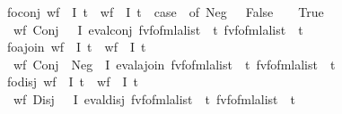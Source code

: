 \begin{isabellebody}
\ \ \ fo{\isacharunderscore}{\kern0pt}conj{\isacharcolon}{\kern0pt}\ {\isachardoublequoteopen}wf\ {\isasymphi}\ I\ t{\isasymphi}\ {\isasymLongrightarrow}\ wf\ {\isasympsi}\ I\ t{\isasympsi}\ {\isasymLongrightarrow}\ {\isacharparenleft}{\kern0pt}case\ {\isasympsi}\ of\ Neg\ {\isasympsi}{\isacharprime}{\kern0pt}\ {\isasymRightarrow}\ False\ {\isacharbar}{\kern0pt}\ {\isacharunderscore}{\kern0pt}\ {\isasymRightarrow}\ True{\isacharparenright}{\kern0pt}\ {\isasymLongrightarrow}\isanewline
\ \ \ \ wf\ {\isacharparenleft}{\kern0pt}Conj\ {\isasymphi}\ {\isasympsi}{\isacharparenright}{\kern0pt}\ I\ {\isacharparenleft}{\kern0pt}eval{\isacharunderscore}{\kern0pt}conj\ {\isacharparenleft}{\kern0pt}fv{\isacharunderscore}{\kern0pt}fo{\isacharunderscore}{\kern0pt}fmla{\isacharunderscore}{\kern0pt}list\ {\isasymphi}{\isacharparenright}{\kern0pt}\ t{\isasymphi}\ {\isacharparenleft}{\kern0pt}fv{\isacharunderscore}{\kern0pt}fo{\isacharunderscore}{\kern0pt}fmla{\isacharunderscore}{\kern0pt}list\ {\isasympsi}{\isacharparenright}{\kern0pt}\ t{\isasympsi}{\isacharparenright}{\kern0pt}{\isachardoublequoteclose}\isanewline
\ \ \ fo{\isacharunderscore}{\kern0pt}ajoin{\isacharcolon}{\kern0pt}\ {\isachardoublequoteopen}wf\ {\isasymphi}\ I\ t{\isasymphi}\ {\isasymLongrightarrow}\ wf\ {\isasympsi}{\isacharprime}{\kern0pt}\ I\ t{\isasympsi}{\isacharprime}{\kern0pt}\ {\isasymLongrightarrow}\isanewline
\ \ \ \ wf\ {\isacharparenleft}{\kern0pt}Conj\ {\isasymphi}\ {\isacharparenleft}{\kern0pt}Neg\ {\isasympsi}{\isacharprime}{\kern0pt}{\isacharparenright}{\kern0pt}{\isacharparenright}{\kern0pt}\ I\ {\isacharparenleft}{\kern0pt}eval{\isacharunderscore}{\kern0pt}ajoin\ {\isacharparenleft}{\kern0pt}fv{\isacharunderscore}{\kern0pt}fo{\isacharunderscore}{\kern0pt}fmla{\isacharunderscore}{\kern0pt}list\ {\isasymphi}{\isacharparenright}{\kern0pt}\ t{\isasymphi}\ {\isacharparenleft}{\kern0pt}fv{\isacharunderscore}{\kern0pt}fo{\isacharunderscore}{\kern0pt}fmla{\isacharunderscore}{\kern0pt}list\ {\isasympsi}{\isacharprime}{\kern0pt}{\isacharparenright}{\kern0pt}\ t{\isasympsi}{\isacharprime}{\kern0pt}{\isacharparenright}{\kern0pt}{\isachardoublequoteclose}\isanewline
\ \ \ fo{\isacharunderscore}{\kern0pt}disj{\isacharcolon}{\kern0pt}\ {\isachardoublequoteopen}wf\ {\isasymphi}\ I\ t{\isasymphi}\ {\isasymLongrightarrow}\ wf\ {\isasympsi}\ I\ t{\isasympsi}\ {\isasymLongrightarrow}\isanewline
\ \ \ \ wf\ {\isacharparenleft}{\kern0pt}Disj\ {\isasymphi}\ {\isasympsi}{\isacharparenright}{\kern0pt}\ I\ {\isacharparenleft}{\kern0pt}eval{\isacharunderscore}{\kern0pt}disj\ {\isacharparenleft}{\kern0pt}fv{\isacharunderscore}{\kern0pt}fo{\isacharunderscore}{\kern0pt}fmla{\isacharunderscore}{\kern0pt}list\ {\isasymphi}{\isacharparenright}{\kern0pt}\ t{\isasymphi}\ {\isacharparenleft}{\kern0pt}fv{\isacharunderscore}{\kern0pt}fo{\isacharunderscore}{\kern0pt}fmla{\isacharunderscore}{\kern0pt}list\ {\isasympsi}{\isacharparenright}{\kern0pt}\ t{\isasympsi}{\isacharparenright}{\kern0pt}{\isachardoublequoteclose}\isanewline

\end{isabellebody}
